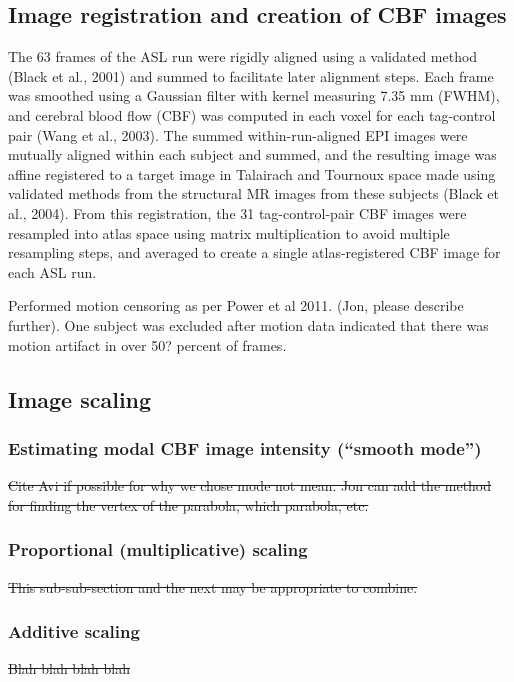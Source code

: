\subsection{Image registration and creation of CBF images}
The 63 frames of the ASL run were rigidly aligned using a validated method (Black et al., 2001) and summed to facilitate later alignment steps. Each frame was smoothed using a Gaussian filter with kernel measuring 7.35 mm (FWHM), and cerebral blood flow (CBF) was computed in each voxel for each tag-control pair (Wang et al., 2003). The summed within-run-aligned EPI images were mutually aligned within each subject and summed, and the resulting image was affine registered to a target image in Talairach and Tournoux space made using validated methods from the structural MR images from these subjects (Black et al., 2004). From this registration, the 31 tag-control-pair CBF images were resampled into atlas space using matrix multiplication to avoid multiple resampling steps, and averaged to create a single atlas-registered CBF image for each ASL run. 


Performed motion censoring as per Power et al 2011. (Jon, please describe further). One subject was excluded after motion data indicated that there was motion artifact in over 50? percent of frames.

\subsection{Image scaling}
\subsubsection{Estimating modal CBF image intensity (``smooth mode'')}
\sout{Cite Avi if possible for why we chose mode not mean. Jon can add the method for finding the vertex of the parabola, which parabola, etc.} 
\subsubsection{Proportional (multiplicative) scaling}
\sout{This sub-sub-section and the next may be appropriate to combine.}
\subsubsection{Additive scaling}
\sout{Blah blah blah blah}

